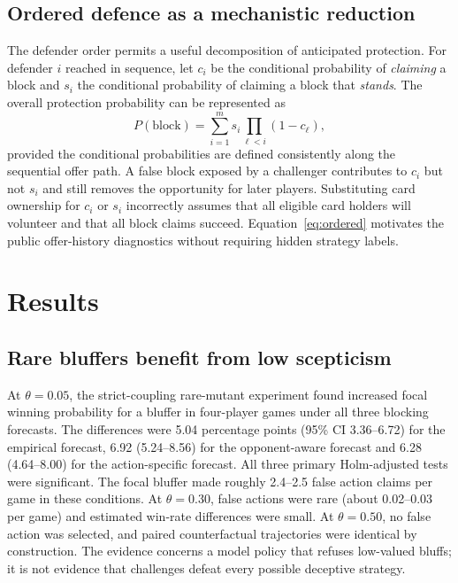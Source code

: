 \documentclass[11pt,a4paper]{article}
\begin{document}
\subsection{Ordered defence as a mechanistic reduction}
The defender order permits a useful decomposition of anticipated protection. For defender $i$ reached in sequence, let $c_i$ be the conditional probability of \emph{claiming} a block and $s_i$ the conditional probability of claiming a block that \emph{stands}. The overall protection probability can be represented as
\begin{equation}
 P(\mathrm{block})=\sum_{i=1}^{m}s_i\prod_{\ell<i}(1-c_\ell),
 \label{eq:ordered}
\end{equation}
provided the conditional probabilities are defined consistently along the sequential offer path. A false block exposed by a challenger contributes to $c_i$ but not $s_i$ and still removes the opportunity for later players. Substituting card ownership for $c_i$ or $s_i$ incorrectly assumes that all eligible card holders will volunteer and that all block claims succeed. Equation~\eqref{eq:ordered} motivates the public offer-history diagnostics without requiring hidden strategy labels.

\section{Results}
\subsection{Rare bluffers benefit from low scepticism}
At $\theta=0.05$, the strict-coupling rare-mutant experiment found increased focal winning probability for a bluffer in four-player games under all three blocking forecasts. The differences were 5.04 percentage points (95\% CI 3.36--6.72) for the empirical forecast, 6.92 (5.24--8.56) for the opponent-aware forecast and 6.28 (4.64--8.00) for the action-specific forecast. All three primary Holm-adjusted tests were significant. The focal bluffer made roughly 2.4--2.5 false action claims per game in these conditions. At $\theta=0.30$, false actions were rare (about 0.02--0.03 per game) and estimated win-rate differences were small. At $\theta=0.50$, no false action was selected, and paired counterfactual trajectories were identical by construction. The evidence concerns a model policy that refuses low-valued bluffs; it is not evidence that challenges defeat every possible deceptive strategy.
\end{document}
